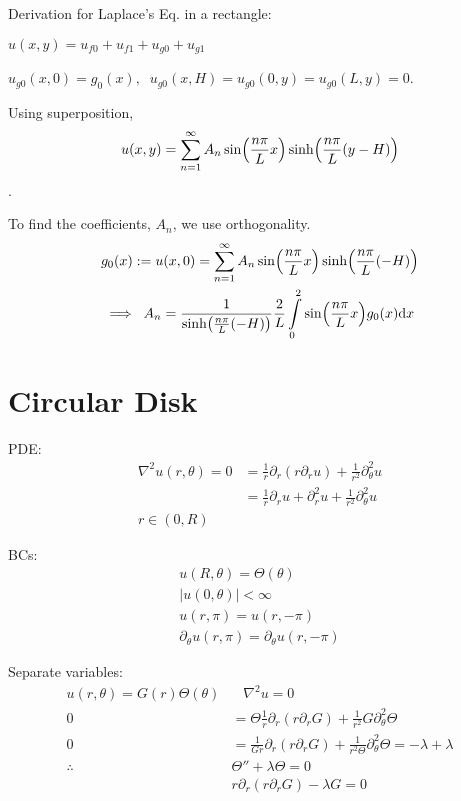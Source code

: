 Derivation for Laplace's Eq. in a rectangle:

$u(x, y) = u_{f0} + u_{f1} + u_{g0} + u_{g1}$

$u_{g0}(x, 0) = g_0(x), \;\;u_{g0}(x, H) = u_{g0}(0, y) = u_{g0}(L, y) = 0$.

Using superposition, 
\[ u(x, y) = \sum\limits_{n=1}^\infty A_n \sin(\frac{n\pi}{L} x) \sinh (\frac{n\pi}{L} (y-H)) \].

To find the coefficients, $A_n$, we use orthogonality. 
\begin{gather*}
	g_0(x) := u(x, 0) = \sum\limits_{n=1}^\infty A_n \sin (\frac{n\pi}{L} x) \sinh ( \frac{n\pi}{L} (-H) )  \\
	\implies \; A_n = \frac{1}{\sinh(\frac{n\pi}{L} (-H) )} \frac{2}{L} \int\limits_0^2 
		\sin(\frac{n\pi}{L} x) g_0(x) \text{d} x
\end{gather*} 


\section{Circular Disk}

PDE: 
\[\begin{aligned}
	\nabla^2 u (r, \theta) = 0 
		&= \frac{1}{r} \partial_r (r \partial_r u) + \frac{1}{r^2} \partial_\theta^2 u \\
		&= \frac{1}{r} \partial_r u + \partial_r^2 u + \frac{1}{r^2} \partial_\theta^2 u \\
	r \in (0, R)
\end{aligned}
 \]

BCs: 
\begin{gather*}
	u(R, \theta) =\Theta(\theta) \tag{Outer edge depends only on angle} \\
	|u(0, \theta)| < \infty \tag{finite at origin} \\
	u(r, \pi) = u(r, -\pi) \tag{periodic I} \\
	\partial_\theta u (r, \pi) = \partial_\theta u(r, -\pi) \tag{periodic II}
\end{gather*}

Separate variables:
\[\begin{aligned}
	u(r, \theta) = G(r) \Theta(\theta) &\;\;\; \nabla^2 u = 0 \\
	0	&= \Theta \frac{1}{r} \partial_r ( r \partial_r G) + \frac{1}{r^2} G \partial_\theta^2 \Theta \\
	0	&= \frac{1}{Gr} \partial_r ( r \partial_r G) + \frac{1}{r^2 \Theta} \partial_\theta^2 \Theta = -\lambda + \lambda \\
	\therefore \; & \boxed{ \Theta'' + \lambda \Theta = 0 } \\
	& \boxed{ r\partial_r ( r\partial_r G) - \lambda G = 0 }
\end{aligned}\]

